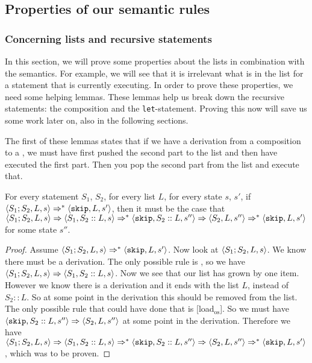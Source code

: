 \subsection{Properties of our semantic rules}

\subsubsection*{Concerning lists and recursive statements}
In this section, we will prove some properties about the lists in combination with the semantics. For example, we will see that it is irrelevant what is in the list for a statement that is currently executing. 
In order to prove these properties, we need some helping lemmas. These lemmas help us break down the recursive statements: the composition and the \texttt{let}-statement. Proving this now will save us some work later on, also in the following sections.  

The first of these lemmas states that if we have a derivation from a composition to a \sk, we must have first pushed the second part to the list and then have executed the first part. Then you pop the second part from the list and execute that. 

\begin{lemma}
\label{breakingdowncomp}
For every statement $S_1$, $S_2$, for every list $L$, for every state $s$, $s'$, if $\langle S_1; S_2, L, s \rangle \Rightarrow ^{*} \langle \texttt{skip}, L, s' \rangle$, then it must be the case that $\langle S_1;S_2, L, s \rangle  \Rightarrow \langle S_1, S_2::L, s \rangle \Rightarrow ^{*} \langle \texttt{skip}, S_2::L, s'' \rangle \Rightarrow \langle S_2, L, s'' \rangle \Rightarrow ^{*} \langle \texttt{skip}, L, s' \rangle$ for some state $s''$. 
\end{lemma}

\begin{proof}
Assume $\langle S_1; S_2, L, s  \rangle \Rightarrow ^{*} \langle \texttt{skip}, L, s' \rangle$. Now look at $\langle S_1; S_2, L, s \rangle$. We know there must be a derivation. The only possible rule is \compsos, so we have $\langle S_1; S_2, L, s \rangle \Rightarrow \langle S_1, S_2::L, s \rangle$. Now we see that our list has grown by one item. However we know there is a derivation and it ends with the list $L$, instead of $S_2::L$. So at some point in the derivation this should be removed from the list. The only possible rule that could have done that is [load$_{\textrm{os}}$]. So we must have $\langle \texttt{skip}, S_2::L, s'' \rangle \Rightarrow \langle S_2, L, s'' \rangle$ at some point in the derivation. Therefore we have $\langle S_1; S_2, L, s \rangle \Rightarrow \langle S_1, S_2::L, s \rangle \Rightarrow ^{*} \langle \texttt{skip}, S_2::L, s'' \rangle \Rightarrow \langle S_2, L, s'' \rangle \Rightarrow ^{*} \langle \texttt{skip}, L, s' \rangle$, which was to be proven.
\end{proof}

